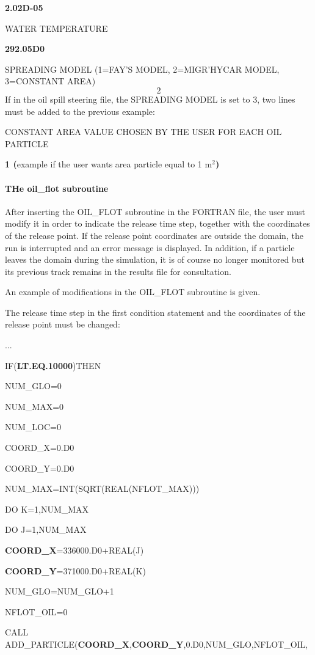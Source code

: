\documentclass{article} %
\begin{document}
\textbf{2.02D-05}

WATER TEMPERATURE

\textbf{292.05D0}

SPREADING MODEL (1=FAY'S MODEL, 2=MIGR'HYCAR MODEL, 3=CONSTANT AREA)
\[2\]
If in the oil spill steering file, the SPREADING MODEL is set to 3, two lines must be added to the previous example:

CONSTANT AREA VALUE CHOSEN BY THE USER FOR EACH OIL PARTICLE

\textbf{1 (}example if the user wants area particle equal to 1 m${}^{2}$\textbf{)}


\paragraph{ THe oil\_flot subroutine}

 After inserting the OIL\_FLOT subroutine in the FORTRAN file, the user must modify it in order to indicate the release time step, together with the coordinates of the release point. If the release point coordinates are outside the domain, the run is interrupted and an error message is displayed. In addition, if a particle leaves the domain during the simulation, it is of course no longer monitored but its previous track remains in the results file for consultation.

 An example of modifications in the OIL\_FLOT subroutine is given.

 The release time step in the first condition statement and the coordinates of the release point must be changed:

...

IF(\textbf{LT.EQ.10000})THEN

  NUM\_GLO=0

  NUM\_MAX=0

  NUM\_LOC=0

  COORD\_X=0.D0

  COORD\_Y=0.D0

  NUM\_MAX=INT(SQRT(REAL(NFLOT\_MAX)))

  DO K=1,NUM\_MAX

    DO J=1,NUM\_MAX

      \textbf{COORD\_X}=336000.D0+REAL(J)

      \textbf{COORD\_Y}=371000.D0+REAL(K)

      NUM\_GLO=NUM\_GLO+1

      NFLOT\_OIL=0

      CALL ADD\_PARTICLE(\textbf{COORD\_X},\textbf{COORD\_Y},0.D0,NUM\_GLO,NFLOT\_OIL,
\end{document}
